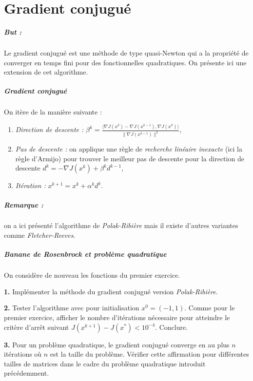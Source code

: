 \documentclass[a4paper,french,12pt]{article}
\begin{document}
\section{Gradient conjugué}
%
\subparagraph{But :} Le gradient conjugué est une méthode de type quasi-Newton qui a la propriété de converger en temps fini pour des fonctionnelles quadratiques. On présente ici une extension de cet algorithme.
\subparagraph{Gradient conjugué}
On itère de la manière suivante :
\begin{enumerate}
\item \textit{Direction de descente :} $\beta^{k} = \frac{\langle \nabla J(x^k) - \nabla J(x^{k-1}), \nabla J(x^k) \rangle}{\| \nabla J(x^{k-1}) \|^2}$,
\item \textit{Pas de descente :} on applique une règle de \textit{recherche linéaire inexacte} (ici la règle d'Armijo) pour trouver le meilleur pas de descente pour la direction de descente $d^k = -\nabla J(x^k) + \beta^k d^{k-1}$,
  \item \textit{Itération :} $x^{k+1} = x^k + \alpha^k d^k$.
  \end{enumerate}
  \subparagraph{Remarque :} on a ici présenté l'algorithme de \textit{Polak-Ribière} mais il existe d'autres variantes comme \textit{Fletcher-Reeves}. 

  \subparagraph{Banane de Rosenbrock et problème quadratique} On considère de nouveau les fonctions du premier exercice.

  \textbf{1.} Implémenter la méthode du gradient conjugué version \textit{Polak-Ribière}.
  
  \textbf{2.} Tester l'algorithme avec pour initialisation $x^0 = (-1,1)$. Comme pour le premier exercice, afficher le nombre d'itérations nécessaire pour atteindre le critère
  d'arrêt suivant $J(x^{k+1})-J(x^*) < 10^{-4}$. Conclure.

  \textbf{3.} Pour un problème quadratique, le gradient conjugué converge en au plus $n$ itérations où $n$ est la taille du problème. Vérifier cette affirmation pour différentes tailles de matrices dans le cadre du problème quadratique introduit précédemment.
  
\end{document}
